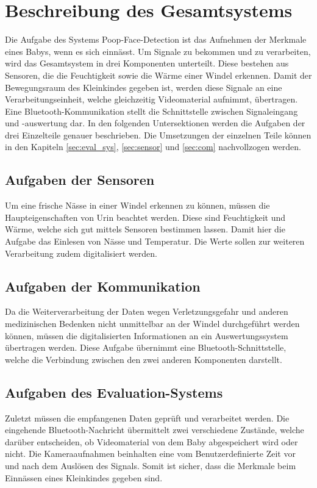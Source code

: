 \section{Beschreibung des Gesamtsystems}
\label{sec:Gesamtsystem}

Die Aufgabe des Systems Poop-Face-Detection ist das Aufnehmen der Merkmale eines Babys, wenn es sich einnässt. Um Signale zu bekommen und zu verarbeiten, wird das Gesamtsystem in drei Komponenten unterteilt. Diese bestehen aus Sensoren, die die Feuchtigkeit sowie die Wärme einer Windel erkennen. Damit der Bewegungsraum des Kleinkindes gegeben ist, werden diese Signale an eine Verarbeitungseinheit, welche gleichzeitig Videomaterial aufnimmt, übertragen. Eine Bluetooth-Kommunikation stellt die Schnittstelle zwischen Signaleingang und -auswertung dar. In den folgenden Untersektionen werden die Aufgaben der drei Einzelteile genauer beschrieben. Die Umsetzungen der einzelnen Teile können in den Kapiteln \ref{sec:eval_sys}, \ref{sec:sensor} und \ref{sec:com} nachvollzogen werden.

\subsection{Aufgaben der Sensoren}

Um eine frische Nässe in einer Windel erkennen zu können, müssen die Haupteigenschaften von Urin beachtet werden. Diese sind Feuchtigkeit und Wärme, welche sich gut mittels Sensoren bestimmen lassen. Damit hier die Aufgabe das Einlesen von Nässe und Temperatur. Die Werte sollen zur weiteren Verarbeitung zudem digitalisiert werden.

\subsection{Aufgaben der Kommunikation}

Da die Weiterverarbeitung der Daten wegen Verletzungsgefahr und anderen medizinischen Bedenken nicht unmittelbar an der Windel durchgeführt werden können, müssen die digitalisierten Informationen an ein Auswertungssystem übertragen werden. Diese Aufgabe übernimmt eine Bluetooth-Schnittstelle, welche die Verbindung zwischen den zwei anderen Komponenten darstellt.

\subsection{Aufgaben des Evaluation-Systems}

Zuletzt müssen die empfangenen Daten geprüft und verarbeitet werden. Die eingehende Bluetooth-Nachricht übermittelt zwei verschiedene Zustände, welche darüber entscheiden, ob Videomaterial von dem Baby abgespeichert wird oder nicht. Die Kameraaufnahmen beinhalten eine vom Benutzerdefinierte Zeit vor und nach dem Auslösen des Signals. Somit ist sicher, dass die Merkmale beim Einnässen eines Kleinkindes gegeben sind.




